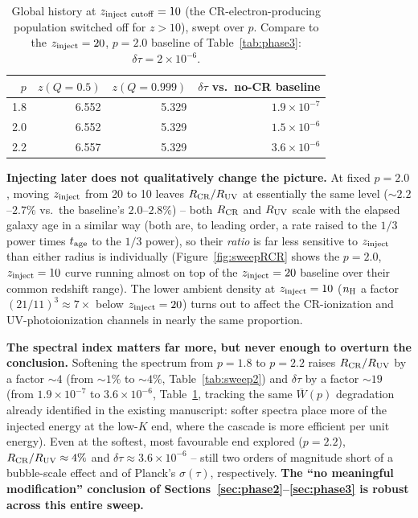 \documentclass[11pt,a4paper]{article}
\begin{document}
\begin{table}[H]
\centering\small
\begin{tabular}{@{}rrrr@{}}
\toprule
$p$ & $z(Q=0.5)$ & $z(Q=0.999)$ & $\delta\tau$ vs.\ no-CR baseline \\
\midrule
1.8 & 6.552 & 5.329 & $1.9\times10^{-7}$ \\
2.0 & 6.552 & 5.329 & $1.5\times10^{-6}$ \\
2.2 & 6.557 & 5.329 & $3.6\times10^{-6}$ \\
\bottomrule
\end{tabular}
\caption{Global history at $z_{\rm inject\ cutoff}=10$ (the CR-electron-producing population
switched off for $z>10$), swept over $p$. Compare to the $z_{\rm inject}=20$, $p=2.0$ baseline
of Table~\ref{tab:phase3}: $\delta\tau=2\times10^{-6}$.}
\label{tab:sweep3}
\end{table}

\textbf{Injecting later does not qualitatively change the picture.} At fixed $p=2.0$, moving
$z_{\rm inject}$ from 20 to 10 leaves $R_{\rm CR}/R_{\rm UV}$ at essentially the same level
($\sim2.2$--$2.7\%$ vs.\ the baseline's $2.0$--$2.8\%$) -- both $R_{\rm CR}$ and $R_{\rm UV}$
scale with the elapsed galaxy age in a similar way (both are, to leading order, a rate raised
to the $1/3$ power times $t_{\rm age}$ to the $1/3$ power), so their \emph{ratio} is far less
sensitive to $z_{\rm inject}$ than either radius is individually (Figure~\ref{fig:sweepRCR}
shows the $p=2.0$, $z_{\rm inject}=10$ curve running almost on top of the $z_{\rm inject}=20$
baseline over their common redshift range). The lower ambient density at $z_{\rm inject}=10$
($n_{\rm H}$ a factor $(21/11)^3\approx7\times$ below $z_{\rm inject}=20$) turns out to affect
the CR-ionization and UV-photoionization channels in nearly the same proportion.

\textbf{The spectral index matters far more, but never enough to overturn the conclusion.}
Softening the spectrum from $p=1.8$ to $p=2.2$ raises $R_{\rm CR}/R_{\rm UV}$ by a factor
$\sim4$ (from $\sim1\%$ to $\sim4\%$, Table~\ref{tab:sweep2}) and $\delta\tau$ by a factor
$\sim19$ (from $1.9\times10^{-7}$ to $3.6\times10^{-6}$, Table~\ref{tab:sweep3}, tracking the
same $\overline{W}(p)$ degradation already identified in the existing manuscript: softer
spectra place more of the injected energy at the low-$K$ end, where the cascade is more
efficient per unit energy). Even at the softest, most favourable end explored ($p=2.2$),
$R_{\rm CR}/R_{\rm UV}\approx4\%$ and $\delta\tau\approx3.6\times10^{-6}$ -- still two orders of
magnitude short of a bubble-scale effect and of Planck's $\sigma(\tau)$, respectively. \textbf{The
``no meaningful modification'' conclusion of Sections~\ref{sec:phase2}--\ref{sec:phase3} is
robust across this entire sweep.}
\end{document}

